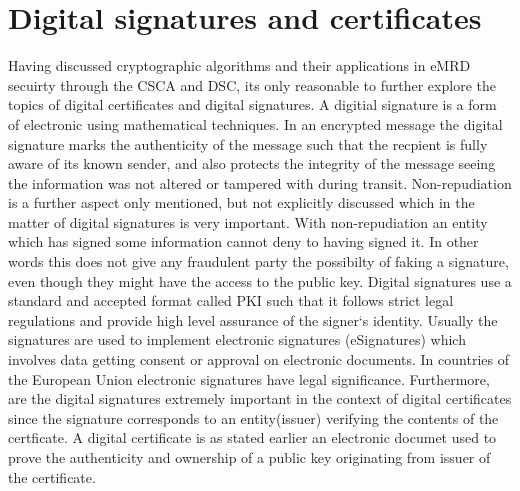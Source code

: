 \documentclass[12pt,
               a4paper,
               article,
               oneside,
               oldfontcommands,
               english]{memoir}
\begin{document}
\section*{Digital signatures and certificates}
Having discussed cryptographic algorithms and their applications in eMRD secuirty through the CSCA and DSC, its only reasonable to further explore the topics of digital certificates and digital signatures. A digitial signature is a form of electronic  using mathematical techniques. In an encrypted message the digital signature marks the authenticity of the message such that the recpient is fully aware of its known sender, and also protects the integrity of the message seeing the information was not altered  or tampered with during transit. Non-repudiation is a further aspect only mentioned, but not explicitly discussed which in the matter of digital signatures is very important. With non-repudiation an entity which has signed some information cannot deny to having signed it. In other words this does not give any fraudulent party the possibilty of faking a signature, even though they might have the access to the public key. Digital signatures use a standard and accepted format called PKI such that it follows strict legal regulations and provide high level assurance of the signer`s identity. Usually the signatures are used to implement electronic signatures (eSignatures) which involves data getting consent or approval on electronic documents. In countries of the European Union electronic signatures have legal significance. Furthermore, are the digital signatures extremely important in the context of digital certificates since the signature corresponds to an entity(issuer) verifying the contents of the certficate. A digital certificate is as stated earlier an electronic documet used to prove the authenticity and ownership of a public key originating from issuer of the certificate.\vspace{4mm}\\
\end{document}
